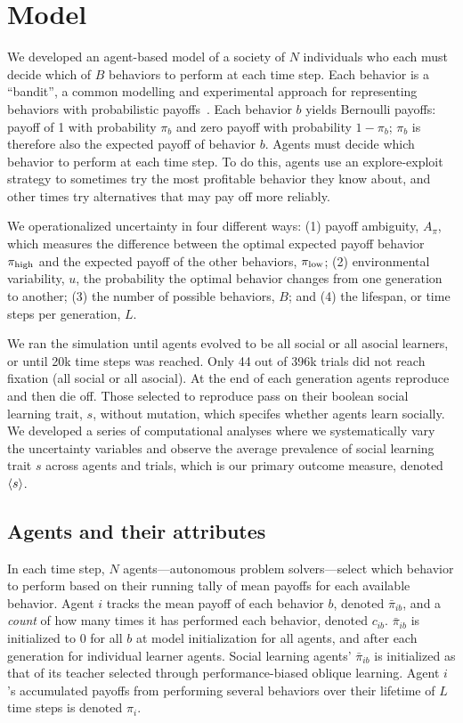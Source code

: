 \documentclass[letterpaper,11.5pt]{scrartcl}
\begin{document}
\section{Model}

We developed an agent-based model of a society of $N$ individuals who each must decide
which of $B$ behaviors to perform at each time step. Each behavior is a ``bandit'',
a common modelling and experimental approach for representing behaviors with
probabilistic payoffs~\cite{SuttonBartoBook, McElreath2005,Rendell2010,Schulz2019}. %
Each behavior $b$ yields Bernoulli payoffs: payoff of 1 with probability $\pi_b$ and zero payoff
with probability $1 - \pi_b$; 
$\pi_b$ is therefore also the expected payoff of behavior $b$. Agents must
decide which behavior to perform at each time step. To do this, agents 
use an explore-exploit strategy to sometimes try the most profitable behavior
they know about, and other times try alternatives that may pay off more reliably. 

We operationalized uncertainty in four different ways: 
(1) payoff ambiguity, $A_\pi$, which measures the difference
between the optimal expected payoff behavior $\pi_{\mathrm{high}}$ and the expected payoff
of the other behaviors, $\pi_{\mathrm{low}}$; 
(2) environmental variability, $u$, the probability the optimal behavior changes from one generation to another; 
(3) the number of possible behaviors, $B$; and 
(4) the lifespan, or time steps per generation, $L$. 

We ran the simulation until agents evolved to be all social or all asocial 
learners, or until 20k time steps was reached. Only 44 out of 396k trials
did not reach fixation (all social or all asocial). At
the end of each generation agents reproduce and then die off. 
Those selected to reproduce
pass on their boolean social learning trait, $s$, without mutation,
which specifes whether agents learn socially. We developed a series of
computational analyses where we systematically vary the uncertainty
variables and observe the average prevalence of social learning trait $s$
across agents and trials, which is our primary outcome measure, 
denoted $\langle s \rangle$. 

\subsection{Agents and their attributes}

In each time step, $N$ agents---autonomous problem solvers---select 
which behavior to perform based on their running tally of mean payoffs for 
each available behavior. %
Agent $i$ tracks the mean payoff of each behavior $b$, denoted $\bar\pi_{ib}$, and
a \emph{count} of how many times it has performed each behavior, denoted $c_{ib}$.
$\bar\pi_{ib}$
is initialized to 0 for all $b$ at model initialization for
all agents, and after each generation for individual learner agents. Social
learning agents' $\bar\pi_{ib}$ is initialized as that of its teacher selected
through performance-biased oblique learning. Agent $i$'s accumulated payoffs
from performing several behaviors over their lifetime of $L$ time steps is
denoted $\pi_{i}$.
\end{document}
